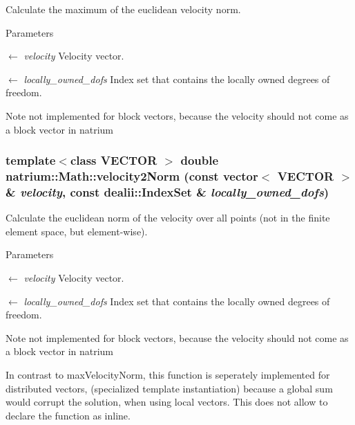 Calculate the maximum of the euclidean velocity norm. 
\begin{DoxyParams}{Parameters}
\item[\mbox{$\leftarrow$} {\em velocity}]Velocity vector. \item[\mbox{$\leftarrow$} {\em locally\_\-owned\_\-dofs}]Index set that contains the locally owned degrees of freedom. \end{DoxyParams}
\begin{DoxyNote}{Note}
not implemented for block vectors, because the velocity should not come as a block vector in natrium 
\end{DoxyNote}
\hypertarget{namespacenatrium_1_1Math_ac6abc916cc66dda84a4e5c28e61be560}{
\subsubsection[{velocity2Norm}]{\setlength{\rightskip}{0pt plus 5cm}template$<$class VECTOR $>$ double natrium::Math::velocity2Norm (const vector$<$ VECTOR $>$ \& {\em velocity}, \/  const dealii::IndexSet \& {\em locally\_\-owned\_\-dofs})}}
\label{namespacenatrium_1_1Math_ac6abc916cc66dda84a4e5c28e61be560}


Calculate the euclidean norm of the velocity over all points (not in the finite element space, but element-\/wise). 
\begin{DoxyParams}{Parameters}
\item[\mbox{$\leftarrow$} {\em velocity}]Velocity vector. \item[\mbox{$\leftarrow$} {\em locally\_\-owned\_\-dofs}]Index set that contains the locally owned degrees of freedom. \end{DoxyParams}
\begin{DoxyNote}{Note}
not implemented for block vectors, because the velocity should not come as a block vector in natrium 

In contrast to maxVelocityNorm, this function is seperately implemented for distributed vectors, (specialized template instantiation) because a global sum would corrupt the solution, when using local vectors. This does not allow to declare the function as inline. 
\end{DoxyNote}
